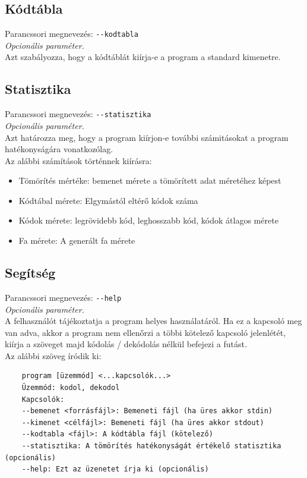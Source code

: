 \documentclass[12pt,a4paper]{report}
\begin{document}
\subsection{Kódtábla}
Parancssori megnevezés: \texttt{-{}-kodtabla} \\
{\it Opcionális paraméter.}\\
Azt szabályozza, hogy a kódtáblát kiírja-e a program a standard kimenetre.

\subsection{Statisztika}
Parancssori megnevezés: \texttt{-{}-statisztika} \\
{\it Opcionális paraméter.}\\
Azt határozza meg, hogy a program kiírjon-e további számitásokat a program hatékonyságára vonatkozólag.\\
Az alábbi számítások történnek kiírásra: \\
\begin{itemize}
    \item Tömörítés mértéke: bemenet mérete a tömörített adat méretéhez képest
    \item Kódtábal mérete: Elgymástól eltérő kódok száma
    \item Kódok mérete: legrövidebb kód, leghosszabb kód, kódok átlagos mérete
    \item Fa mérete: A generált fa mérete
\end{itemize}

\subsection{Segítség}
Parancssori megnevezés: \texttt{-{}-help} \\
{\it Opcionális paraméter.}\\
A felhasználót tájékoztatja a program helyes használatáról. Ha ez a kapcsoló meg van adva, akkor a program nem ellenőrzi
a többi kötelező kapcsoló jelenlétét, kiírja a szöveget majd kódolás / dekódolás nélkül befejezi a futást.\\
Az alábbi szöveg íródik ki: \\
\begin{verbatim}    
    program [üzemmód] <...kapcsolók...>
    Üzemmód: kodol, dekodol
    Kapcsolók:
    --bemenet <forrásfájl>: Bemeneti fájl (ha üres akkor stdin)
    --kimenet <célfájl>: Bemeneti fájl (ha üres akkor stdout)
    --kodtabla <fájl>: A kódtábla fájl (kötelező)
    --statisztika: A tömörítés hatékonyságát értékelő statisztika (opcionális)
    --help: Ezt az üzenetet írja ki (opcionális)
\end{verbatim}
\end{document}
